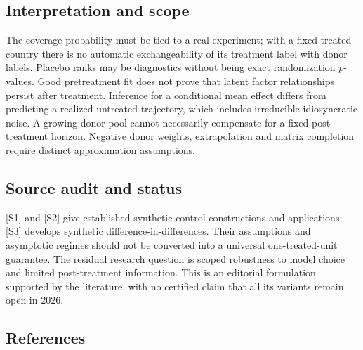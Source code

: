\documentclass[11pt,a4paper]{article}
\begin{document}
\subsection*{Interpretation and scope}

The coverage probability must be tied to a real experiment; with a fixed treated country there is no automatic exchangeability of its treatment label with donor labels. Placebo ranks may be diagnostics without being exact randomization $p$-values. Good pretreatment fit does not prove that latent factor relationships persist after treatment. Inference for a conditional mean effect differs from predicting a realized untreated trajectory, which includes irreducible idiosyncratic noise. A growing donor pool cannot necessarily compensate for a fixed post-treatment horizon. Negative donor weights, extrapolation and matrix completion require distinct approximation assumptions.

\subsection*{Source audit and status}

[S1] and [S2] give established synthetic-control constructions and applications; [S3] develops synthetic difference-in-differences. Their assumptions and asymptotic regimes should not be converted into a universal one-treated-unit guarantee. The residual research question is scoped robustness to model choice and limited post-treatment information. This is an editorial formulation supported by the literature, with no certified claim that all its variants remain open in 2026.

\subsection*{References}
\end{document}
